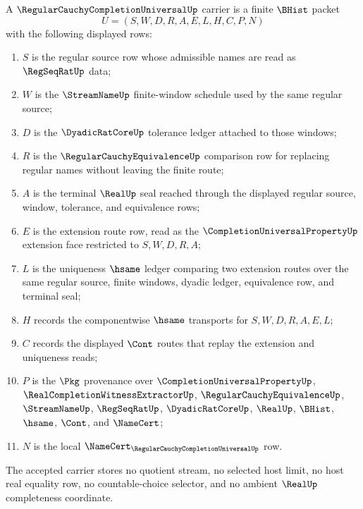 \begin{definition}
\label{def:regular-cauchy-completion-universal-carrier}
A $\RegularCauchyCompletionUniversalUp$ carrier is a finite $\BHist$ packet
$$
U=(S,W,D,R,A,E,L,H,C,P,N)
$$
with the following displayed rows:
\begin{enumerate}
\item $S$ is the regular source row whose admissible names are read as $\RegSeqRatUp$ data;
\item $W$ is the $\StreamNameUp$ finite-window schedule used by the same regular source;
\item $D$ is the $\DyadicRatCoreUp$ tolerance ledger attached to those windows;
\item $R$ is the $\RegularCauchyEquivalenceUp$ comparison row for replacing regular names without leaving the finite route;
\item $A$ is the terminal $\RealUp$ seal reached through the displayed regular source, window, tolerance, and equivalence rows;
\item $E$ is the extension route row, read as the $\CompletionUniversalPropertyUp$ extension face restricted to $S,W,D,R,A$;
\item $L$ is the uniqueness $\hsame$ ledger comparing two extension routes over the same regular source, finite windows, dyadic ledger, equivalence row, and terminal seal;
\item $H$ records the componentwise $\hsame$ transports for $S,W,D,R,A,E,L$;
\item $C$ records the displayed $\Cont$ routes that replay the extension and uniqueness reads;
\item $P$ is the $\Pkg$ provenance over $\CompletionUniversalPropertyUp$, $\RealCompletionWitnessExtractorUp$, $\RegularCauchyEquivalenceUp$, $\StreamNameUp$, $\RegSeqRatUp$, $\DyadicRatCoreUp$, $\RealUp$, $\BHist$, $\hsame$, $\Cont$, and $\NameCert$;
\item $N$ is the local $\NameCert_{\RegularCauchyCompletionUniversalUp}$ row.
\end{enumerate}
The accepted carrier stores no quotient stream, no selected host limit, no host real equality row, no countable-choice selector, and no ambient $\RealUp$ completeness coordinate.
\end{definition}


